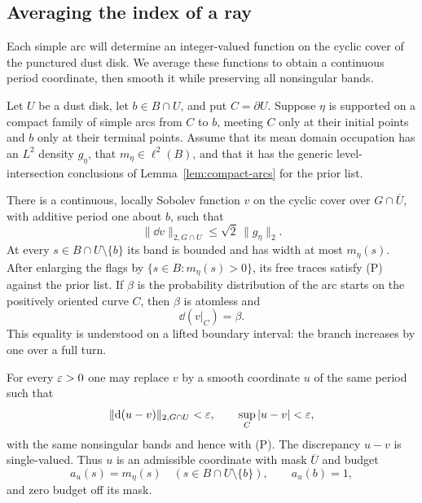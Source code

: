 \subsection{Averaging the index of a ray}

Each simple arc will determine an integer-valued function on the cyclic
cover of the punctured dust disk.  We average these functions to obtain
a continuous period coordinate, then smooth it while preserving all
nonsingular bands.

\begin{lemma}\label{lem:stream}
Let $U$ be a dust disk, let $b\in B\cap U$, and put $C=\partial U$.
Suppose $\eta$ is supported on a compact family of simple arcs from $C$
to $b$, meeting $C$ only at their initial points and $b$ only at their
terminal points.  Assume that its mean domain occupation has an
$L^2$ density $g_\eta$, that $m_\eta\in\ell^2(B)$, and that it has
the generic level-intersection conclusions of
Lemma~\ref{lem:compact-arcs} for the prior list.

There is a continuous, locally Sobolev function $v$ on the cyclic cover
over $G\cap\overline U$, with additive period one about $b$, such that
\begin{equation}\label{eq:stream-energy}
 \|\dd v\|_{2,G\cap U}\le\sqrt2\,\|g_\eta\|_2.
\end{equation}
At every $s\in B\cap U\setminus\{b\}$ its band is bounded and has
width at most $m_\eta(s)$.  After enlarging the flags by
$\{s\in B:m_\eta(s)>0\}$, its free traces satisfy (P) against the
prior list.
If $\beta$ is the probability distribution of the arc starts on the
positively oriented curve $C$, then $\beta$ is atomless and
\begin{equation}\label{eq:stream-boundary-measure}
 \dd(v|_C)=\beta.
\end{equation}
This equality is understood on a lifted boundary interval: the branch
increases by one over a full turn.

For every $\varepsilon>0$ one may replace $v$ by a smooth coordinate $u$ of
the same period such that
\begin{equation}\label{eq:stream-smoothing}
 \|\mathrm d(u-v)\|_{2,G\cap U}<\varepsilon,
 \qquad \sup_C|u-v|<\varepsilon,
\end{equation}
with the same nonsingular bands and hence with (P).  The discrepancy
$u-v$ is single-valued.  Thus $u$ is an admissible coordinate with
mask $\overline U$ and budget
\[
 a_u(s)=m_\eta(s)\quad(s\in B\cap U\setminus\{b\}),
 \qquad a_u(b)=1,
\]
and zero budget off its mask.
\end{lemma}

